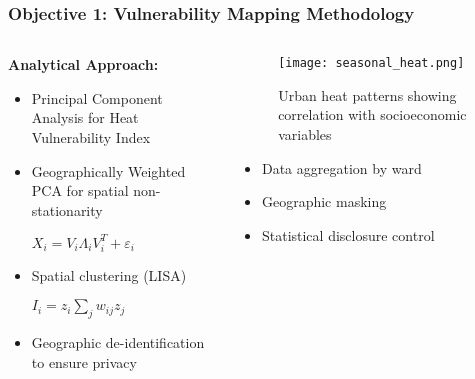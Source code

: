 \documentclass[aspectratio=169]{beamer}
\begin{document}
\begin{frame}
    \frametitle{Objective 1: Vulnerability Mapping Methodology}
    
    \begin{columns}[T]
        \begin{column}{0.55\textwidth}
            \textbf{\large Analytical Approach:}
            \begin{itemize}[leftmargin=*, itemsep=3pt]
                \item Principal Component Analysis for Heat Vulnerability Index
                \item Geographically Weighted PCA for spatial non-stationarity
                
                $X_i = V_i \Lambda_i V_i^T + \varepsilon_i$
                
                \item Spatial clustering (LISA)
                
                $I_i = z_i\sum_{j}w_{ij}z_j$
                
                \item Geographic de-identification to ensure privacy
            \end{itemize}
        \end{column}
        \begin{column}{0.42\textwidth}
            \begin{figure}
                \texttt{[image: seasonal\_heat.png]}
                \caption{\small Urban heat patterns showing correlation with socioeconomic variables}
            \end{figure}
            
            \vspace{-0.2cm}
            \begin{infobox}
                \begin{itemize}[leftmargin=*, itemsep=2pt]
                    \item Data aggregation by ward
                    \item Geographic masking
                    \item Statistical disclosure control
                \end{itemize}
            \end{infobox}
        \end{column}
    \end{columns}
\end{frame}
\end{document}
